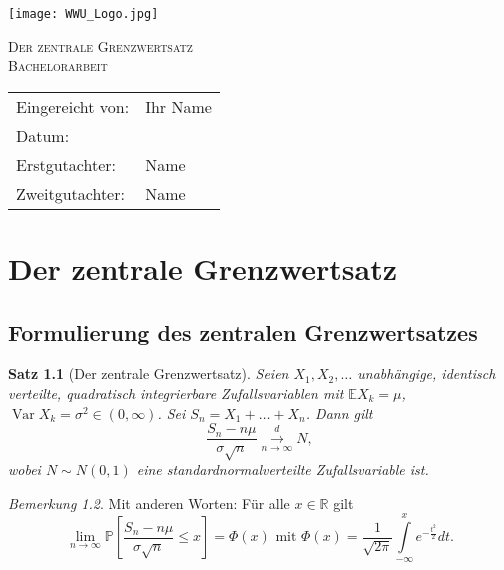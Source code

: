 \documentclass[11pt]{scrreprt}
\renewcommand{\P}{\mathbb {P}} %
\newcommand{\E}{\mathbb {E}}   %
\newcommand{\R}{\mathbb {R}}   %
\newcommand{\dif}{d}
\DeclareMathOperator{\Var}{Var}
\newcommand{\tod}{\overset{{d}}{\underset{n\to\infty}\longrightarrow}}
\theoremstyle{plain}
\newtheorem{satz}{Satz}[chapter]
\theoremstyle{remark}
\newtheorem{bem}[satz]{Bemerkung}
\numberwithin{equation}{chapter}
\numberwithin{satz}{chapter}
\numberwithin{section}{chapter}
\begin{document}
\begin{titlepage}

\texttt{[image: WWU\_Logo.jpg]}

\vspace{6cm}

\begin{center}
{\huge \scshape Der zentrale Grenzwertsatz}\\
\vspace{7mm}
{\Large \textsc{Bachelorarbeit}}\\
\end{center}

\vspace{7cm}

\begin{tabular}{ll}
Eingereicht von:  &Ihr Name\\
Datum:            &\\
Erstgutachter:    &Name\\
Zweitgutachter:   &Name\\
\end{tabular}

\vspace{3cm}
\end{titlepage}


\tableofcontents



\chapter{Der zentrale Grenzwertsatz}
\section{Formulierung des zentralen Grenzwertsatzes}

\begin{satz}[Der zentrale Grenzwertsatz]\label{satz:zgws}
Seien $X_1, X_2, \ldots$ unabhängige, identisch verteilte, quadratisch integrierbare Zufallsvariablen mit $\E X_k = \mu$, $\Var X_k = \sigma^2\in (0,\infty)$. Sei $S_n = X_1 + \ldots + X_n$. Dann gilt
$$
\frac{S_n - n\mu}{\sigma \sqrt{n}} \tod N,
$$
wobei $N \sim N(0,1)$ eine standardnormalverteilte Zufallsvariable ist.
\end{satz}
\begin{bem}
Mit anderen Worten:  Für alle $x \in \R$ gilt
$$
\lim_{n \to \infty} \P\left[\frac{S_n - n\mu}{\sigma \sqrt{n}} \leq x \right] = \Phi(x)
\text{ mit }
\Phi(x) = \frac{1}{\sqrt{2 \pi}} \int\limits_{-\infty}^x  e^{-\frac{t^2}{2}} \dif t.
$$
\end{bem}
\end{document}
